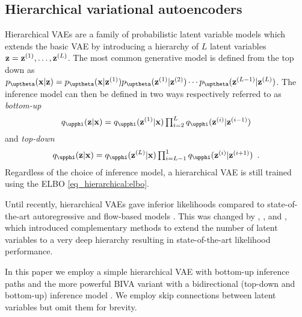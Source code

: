 {\subsection{Hierarchical variational autoencoders}\label{sec_paper_hierarchical:background-hie-VAE}
Hierarchical VAEs are a family of probabilistic latent variable models which extends the basic VAE by introducing a hierarchy of $L$ latent variables ${\mathbf{z}}={\mathbf{z}}^{(1)}, \dots, {\mathbf{z}}^{(L)}$.
The most common generative model is defined from the top down as $p_\thetab(\xb|\zb)=p_\thetab(\xb|\zb^{(1)})p_\thetab(\zb^{(1)}|\zb^{(2)})\cdots p_\thetab(\zb^{(L-1)}|\zb^{(L)})$.
The inference model can then be defined in two ways respectively referred to as \textit{bottom-up} \parencite{burda_importance_2016}
\begin{equation}
    q_\phib(\zb|\xb) = q_\phib(\zb^{(1)}|\xb)\textstyle\prod_{i=2}^{L} q_\phib(\zb^{(i)}|\zb^{(i-1)})
\end{equation}
and \textit{top-down} \parencite{sonderby_ladder_2016}
\begin{equation}
    q_\phib(\zb|\xb) = q_\phib(\zb^{(L)}|\xb)\textstyle\prod_{i=L-1}^{1} q_\phib(\zb^{(i)}|\zb^{(i+1)}) \enspace .
\end{equation}
Regardless of the choice of inference model, a hierarchical VAE is still trained using the ELBO \cref{eq_hierarchical:elbo}.

Until recently, hierarchical VAEs gave inferior likelihoods compared to state-of-the-art autoregressive \parencite{ho_flow_2019} and flow-based models \parencite{salimans_pixelcnn_2017}.
This was changed by \textcite{maaloe_biva_2019}, \textcite{vahdat_nvae_2020}, and \textcite{child_very_2021}, which introduced complementary methods to extend the number of latent variables to a very deep hierarchy resulting in state-of-the-art likelihood performance.

In this paper we employ a simple hierarchical VAE with bottom-up inference paths and the more powerful BIVA variant with a bidirectional (top-down and bottom-up) inference model \parencite{maaloe_biva_2019}. We employ skip connections between latent variables but omit them for brevity.


}
